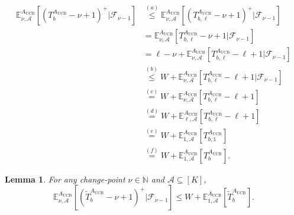 \documentclass[10pt,a4paper]{amsart}
\newtheorem{lemma}{Lemma}
\newcommand{\E}{\mathbb{E}}
\newcommand{\lb}{\left[}
\newcommand{\lp}{\left(}
\newcommand{\mbb}{\mathbb}
\newcommand{\mcal}{\mathcal}
\newcommand{\mrm}{\mathrm}
\newcommand{\rb}{\right]}
\newcommand{\rp}{\right)}
\begin{document}
\begin{align}
    \E_{\nu,\mcal{A}}^{A_{\mrm{UCB}}} \lb \lp T_{b}^{A_{\mrm{UCB}}} - \nu + 1\rp^{+} \Big| \mcal{F}_{\nu-1} \rb &\overset{(a)}{\leq} \E_{\nu,\mcal{A}}^{A_{\mrm{UCB}}} \lb \lp T_{b, \ell}^{A_{\mrm{UCB}}} - \nu + 1\rp^{+} \Big| \mcal{F}_{\nu-1} \rb \nonumber\\
    &= \E_{\nu,\mcal{A}}^{A_{\mrm{UCB}}} \lb T_{b, \ell}^{A_{\mrm{UCB}}} - \nu + 1 \Big| \mcal{F}_{\nu-1} \rb \nonumber\\
    &= \ell - \nu + \E_{\nu,\mcal{A}}^{A_{\mrm{UCB}}} \lb T_{b, \ell}^{A_{\mrm{UCB}}} - \ell + 1 \Big| \mcal{F}_{\nu-1} \rb \nonumber\\
    &\overset{(b)}{\leq} W + \E_{\nu,\mcal{A}}^{A_{\mrm{UCB}}} \lb T_{b, \ell}^{A_{\mrm{UCB}}} - \ell + 1 \Big| \mcal{F}_{\nu-1} \rb \nonumber\\
    &\overset{(c)}{=} W + \E_{\nu,\mcal{A}}^{A_{\mrm{UCB}}} \lb T_{b, \ell}^{A_{\mrm{UCB}}} - \ell + 1 \rb \nonumber\\
    &\overset{(d)}{=} W + \E_{\ell,\mcal{A}}^{A_{\mrm{UCB}}} \lb T_{b, \ell}^{A_{\mrm{UCB}}} - \ell + 1 \rb \nonumber\\
    &\overset{(e)}{=} W + \E_{1,\mcal{A}}^{A_{\mrm{UCB}}} \lb T_{b, 1}^{A_{\mrm{UCB}}} \rb \nonumber\\
    &\overset{(f)}{=} W + \E_{1,\mcal{A}}^{A_{\mrm{UCB}}} \lb T_{b}^{A_{\mrm{UCB}}} \rb. \label{eq:CuSum_Lem1_laststep}
\end{align}

\begin{lemma}\label{lem:nu_to_one_PA}
For any change-point $\nu \in \mbb{N}$ and $\mcal{A} \subseteq \lb K \rb$,
\begin{equation}\label{eq:lem1}
    \E_{\nu,\mcal{A}}^{A_{\mrm{UCB}}} \lb \lp \tilde{T}_{b}^{A_{\mrm{UCB}}} - \nu + 1\rp^{+} \Big| \mcal{F}_{\nu-1} \rb \leq W + \E_{1,\mcal{A}}^{A_{\mrm{UCB}}} \lb \tilde{T}_{b}^{A_{\mrm{UCB}}} \rb.
\end{equation}
\end{lemma}
\end{document}
